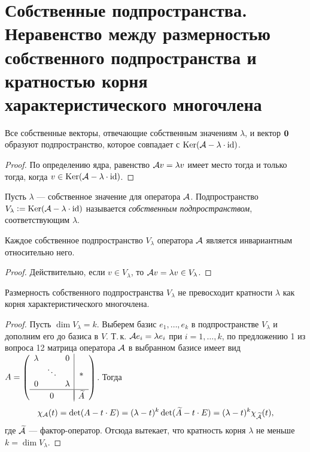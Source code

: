 \section{Собственные подпространства. Неравенство между размерностью собственного подпространства и кратностью корня характеристического многочлена}

\begin{proposal}
    Все собственные векторы, отвечающие собственным значениям $\lambda$, и вектор $\boldsymbol{0}$ образуют подпространство, которое совпадает с $\operatorname{Ker}(\mathcal{A} - \lambda \cdot \mathrm{id})$.
\end{proposal}

\begin{proof}
    По определению ядра, равенство $\mathcal{A} v = \lambda v$ имеет место тогда и только тогда, когда $v \in \operatorname{Ker}(\mathcal{A} - \lambda \cdot \mathrm{id})$.
\end{proof}

\begin{definition}
    Пусть $\lambda$ --- собственное значение для оператора $\mathcal{A}$. Подпространство $V_\lambda \vcentcolon = \operatorname{Ker}(\mathcal{A} - \lambda \cdot \mathrm{id})$ называется \textit{собственным подпространством}, соответствующим $\lambda$.
\end{definition}

\begin{proposal}
    Каждое собственное подпространство $V_\lambda$ оператора $\mathcal{A}$ является инвариантным относительно него.
\end{proposal}

\begin{proof}
    Действительно, если $v \in V_\lambda$, то $\mathcal{A} v = \lambda v \in V_\lambda$.
\end{proof}

\begin{proposal}
    Размерность собственного подпространства $V_\lambda$ не превосходит кратности $\lambda$ как корня характеристического многочлена.
\end{proposal}

\begin{proof}
    Пусть $\dim V_\lambda = k$. Выберем базис $e_1, \ldots, e_k$ в подпространстве $V_\lambda$ и дополним его до базиса в $V$. Т.\,к. $\mathcal{A} e_i = \lambda e_i$ при $i = 1, \ldots, k$, по предложению 1 из вопроса 12 матрица оператора $\mathcal{A}$ в выбранном базисе имеет вид
    $
    A = 
    \left(
    \begin{array}{c c c | c}
        \lambda & & 0 & \\
         & \ddots & & \ast\\
        0 & & \lambda & \\
        \hline
         & & & \vspace{-4mm}\\
         & 0 & & \widetilde{A}
    \end{array}
    \right)
    $. Тогда \[\chi_{\mathcal{A}}(t) = \det(A - t \cdot E) = (\lambda - t)^k\det(\widetilde{A} - t \cdot E) = (\lambda - t)^k\chi_{\widetilde{\mathcal{A}}}(t),\] где $\widetilde{\mathcal{A}}$ --- фактор-оператор. Отсюда вытекает, что кратность корня $\lambda$ не меньше $k = \dim V_\lambda$.
\end{proof}


